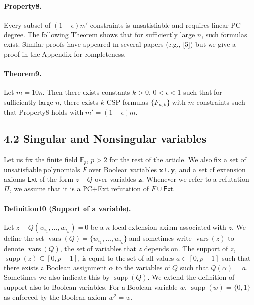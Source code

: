 \documentclass[10pt,a4paper]{article}
\DeclareMathOperator{\supp}{supp}
\DeclareMathOperator{\vars}{vars}
\begin{document}
\paragraph{Property8.} Every subset of $(1-\epsilon)m'$ constraints is unsatisfiable and requires linear PC degree.
The following Theorem shows that for sufficiently large $n$, such formulas exist. Similar proofs have appeared in several papers (e.g., [5]) but we give a proof in the Appendix for completeness.
\paragraph{Theorem9.} Let $m=10n$. Then there exists constants $k>0$, $0<\epsilon<1$ such that for sufficiently large $n$, there exists $k$-CSP formulas $\{F_{n,k}\}$ with $m$ constraints such that Property8 holds with $m'=(1-\epsilon)m$.

\subsection*{4.2 Singular and Nonsingular variables}
Let us fix the finite field $\mathbb F_p$, $p>2$ for the rest of the article. We also fix a set of unsatisfiable polynomials $F$ over Boolean variables $\mathbf x\cup\mathbf y$, and a set of extension axioms $\mathsf{Ext}$ of the form $z-Q$ over variables $\mathbf z$. Whenever we refer to a refutation $\Pi$, we assume that it is a PC+Ext refutation of $F\cup\mathsf{Ext}$.
\paragraph{Definition10 (Support of a variable).}
Let $z-Q(w_{i_1},\ldots,w_{i_{\kappa}})=0$ be a $\kappa$-local extension axiom associated with $z$. We define the set $\vars(Q)=\{w_{i_1},\ldots,w_{i_{\kappa}}\}$ and sometimes write $\vars(z)$ to denote $\vars(Q)$, the set of variables that $z$ depends on. The support of $z$, $\supp(z)\subseteq[0,p-1]$, is equal to the set of all values $a\in[0,p-1]$ such that there exists a Boolean assignment $\alpha$ to the variables of $Q$ such that $Q(\alpha)=a$. Sometimes we also indicate this by $\supp(Q)$.
We extend the definition of support also to Boolean variables. For a Boolean variable $w$, $\supp(w)=\{0,1\}$ as enforced by the Boolean axiom $w^2=w$.
\end{document}
